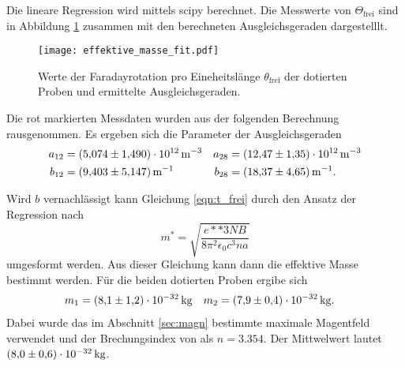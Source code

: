 Die lineare Regression wird mittels scipy \cite{scipy} berechnet. Die Messwerte von $\Theta_\mathrm{frei}$ sind in Abbildung \ref{fig:fit} zusammen mit den berechneten 
Ausgleichsgeraden dargestelllt. 

\begin{figure}
              \centering
              \texttt{[image: effektive\_masse\_fit.pdf]}
              \caption{Werte der Faradayrotation pro Eineheitslänge $\theta_\text{frei}$ der dotierten Proben und ermittelte Ausgleichsgeraden.}
              \label{fig:fit}
\end{figure}

Die rot markierten Messdaten wurden aus der folgenden Berechnung rausgenommen. Es ergeben sich die Parameter der Ausgleichsgeraden 
\begin{align*}
              a_{12} &= \qty{5.074+-1.490e12}{\metre^{-3}} &  a_{28} &= \qty{12.47+-1.35e12}{\metre^{-3}} \\
              b_{12} &= \qty{9.403+-5.147}{\metre^{-1}} & b_{28} &= \qty{18.37+-4.65}{\metre^{-1}}.
\end{align*}

Wird $b$ vernachlässigt kann Gleichung \eqref{eqn:t_frei} durch den Ansatz der Regression nach 
\begin{equation}
              \label{eqn:t_final}
              m^* = \sqrt{\frac{e**3NB}{8\pi^2\epsilon_0c^3na}}
\end{equation}
umgesformt werden. Aus dieser Gleichung kann dann die effektive Masse bestimmt werden. Für die beiden dotierten Proben ergibe sich 
\begin{align*}
              m_1 &= \qty{8.1+-1.2e-32}{\kilo\gram} & m_2 &=  \qty{7.9+-0.4e-32}{\kilo\gram}.
\end{align*}
Dabei wurde das im Abschnitt \ref{sec:magn} bestimmte maximale Magentfeld verwendet und der Brechungsindex von  als $n = \num{3.354}$.
Der Mittwelwert lautet $\qty{8+-0.6e-32}{\kilo\gram}$.